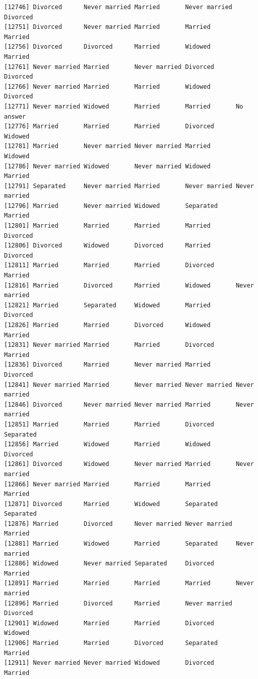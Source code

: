 \documentclass[
  letterpaper,
  DIV=11,
  numbers=noendperiod,
  oneside]{scrartcl}
\begin{document}
\begin{verbatim}
[12746] Divorced      Never married Married       Never married Divorced     
[12751] Divorced      Never married Married       Married       Married      
[12756] Divorced      Divorced      Married       Widowed       Married      
[12761] Never married Married       Never married Divorced      Divorced     
[12766] Never married Married       Married       Widowed       Divorced     
[12771] Never married Widowed       Married       Married       No answer    
[12776] Married       Married       Married       Divorced      Widowed      
[12781] Married       Never married Never married Married       Widowed      
[12786] Never married Widowed       Never married Widowed       Married      
[12791] Separated     Never married Married       Never married Never married
[12796] Married       Never married Widowed       Separated     Married      
[12801] Married       Married       Married       Married       Divorced     
[12806] Divorced      Widowed       Divorced      Married       Divorced     
[12811] Married       Married       Married       Divorced      Married      
[12816] Married       Divorced      Married       Widowed       Never married
[12821] Married       Separated     Widowed       Married       Divorced     
[12826] Married       Married       Divorced      Widowed       Married      
[12831] Never married Married       Married       Divorced      Married      
[12836] Divorced      Married       Never married Married       Divorced     
[12841] Never married Married       Never married Never married Never married
[12846] Divorced      Never married Never married Married       Never married
[12851] Married       Married       Married       Divorced      Separated    
[12856] Married       Widowed       Married       Widowed       Divorced     
[12861] Divorced      Widowed       Never married Married       Never married
[12866] Never married Married       Married       Married       Married      
[12871] Divorced      Married       Widowed       Separated     Separated    
[12876] Married       Divorced      Never married Never married Married      
[12881] Married       Widowed       Married       Separated     Never married
[12886] Widowed       Never married Separated     Divorced      Married      
[12891] Married       Married       Married       Married       Never married
[12896] Married       Divorced      Married       Never married Divorced     
[12901] Widowed       Married       Married       Divorced      Widowed      
[12906] Married       Married       Divorced      Separated     Married      
[12911] Never married Never married Widowed       Divorced      Married      

\end{verbatim}
\end{document}
